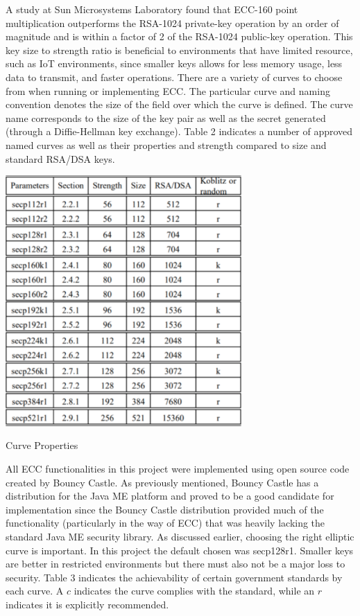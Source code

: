 A study at Sun Microsystems Laboratory found that ECC-160 point multiplication outperforms the RSA-1024 private-key operation by an order of magnitude and is within a factor of 2 of the RSA-1024 public-key operation. This key size to strength ratio is beneficial to environments that have limited resource, such as IoT environments, since smaller keys allows for less memory usage, less data to transmit, and faster operations. There are a variety of curves to choose from when running or implementing ECC. The particular curve and naming convention denotes the size of the field over which the curve is defined. The curve name corresponds to the size of the key pair as well as the secret generated (through a Diffie-Hellman key exchange). Table 2 indicates a number of approved named curves as well as their properties and strength compared to size and standard RSA/DSA keys.

 
 \begin{table}[t]
	\centering
	\includegraphics[width=9cm,height=0.7\textheight,keepaspectratio]{./figures/table_2}
	\center\caption[font=footnote]{Curve Properties}
\end{table}

All ECC functionalities in this project were implemented using open source code created by Bouncy Castle. As previously mentioned, Bouncy Castle has a distribution for the Java ME platform and proved to be a good candidate for implementation since the Bouncy Castle distribution provided much of the functionality (particularly in the way of ECC) that was heavily lacking the standard Java ME security library. As discussed earlier, choosing the right elliptic curve is important. In this project the default chosen was secp128r1. Smaller keys are better in restricted environments but there must also not be a major loss to security. Table 3 indicates the achievability of certain government standards by each curve. A $c$ indicates the curve complies with the standard, while an $r$ indicates it is explicitly recommended.


